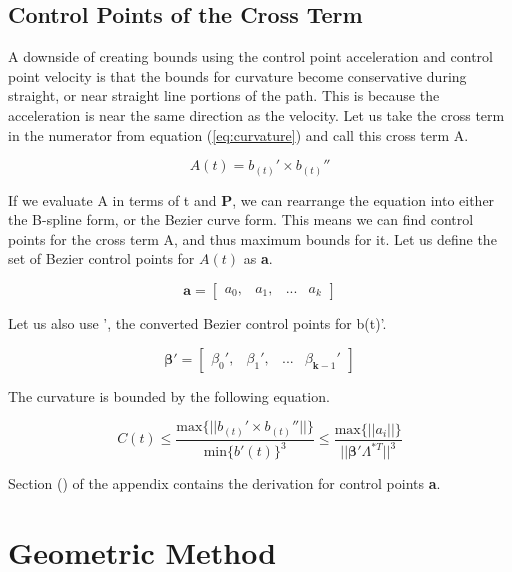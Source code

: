 \documentclass{article}
\begin{document}
\subsection{Control Points of the Cross Term}

A downside of creating bounds using the control point acceleration and control point velocity is that the bounds for curvature become conservative during straight, or near straight line portions of the path. This is because the acceleration is near the same direction as the velocity. Let us take the cross term in the numerator from equation (\ref{eq:curvature}) and call this cross term A. 

\begin{equation}
    A(t)  = b_{(t)}' \times b_{(t)}''
\end{equation}

If we evaluate A in terms of t and \textbf{P}, we can rearrange the equation into either the B-spline form, or the Bezier curve form. This means we can find control points for the cross term A, and thus maximum bounds for it. Let us define the set of Bezier control points for \(A(t)\) as \textbf{a}.

\begin{equation}
    \textbf{a} = \begin{bmatrix}a_0, & a_1, & ... & a_{k}    \end{bmatrix}
\end{equation}

Let us also use \boldsymbol{\beta}', the converted Bezier control points for b(t)'.

\begin{equation}
    \boldsymbol{\beta}' = \begin{bmatrix} \beta_0', & \beta_1', & ... & \beta_{\textbf{k}-1}' \end{bmatrix}
\end{equation}

The curvature is bounded by the following equation.

\begin{equation}
    C(t) \leq \frac{\text{max}\{||b_{(t)}' \times b_{(t)}''||\}}{\text{min}\{b'(t)\}^3} \leq \frac{\text{max}\{||a_i||\}}{||\boldsymbol{\beta}' \Lambda^{*T}||^3}
\end{equation}

Section () of the appendix contains the derivation for control points \textbf{a}.

\section{Geometric Method}
\end{document}
